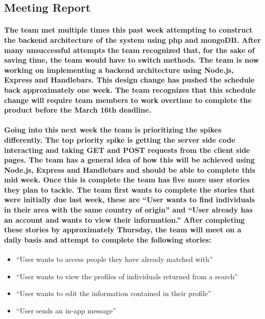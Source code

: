 \documentclass[12pt]{article}
\begin{document}
\begin{enumerate}
\begin{enumerate}
\begin{enumerate}
\begin{enumerate}
\section{\bf Meeting Report}

\paragraph{\normalfont \indent The team met multiple times this past week attempting to construct the backend architecture of the system using php and mongoDB. After many unsuccessful attempts the team recognized that, for the sake of saving time, the team would have to switch methods. The team is now working on implementing a backend architecture using Node.js, Express and Handlebars. This design change has pushed the schedule back approximately one week. The team recognizes that this schedule change will require team members to work overtime to complete the product before the March 16th deadline.
}
\paragraph{\normalfont \indent Going into this next week the team is prioritizing the spikes differently. The top priority spike is getting the server side code interacting and taking GET and POST requests from the client side pages. The team has a general idea of how this will be achieved using Node.js, Express and Handlebars and should be able to complete this mid week. Once this is complete the team has five more user stories they plan to tackle. The team first wants to complete the stories that were initially due last week, these are “User wants to find individuals in their area with the same country of origin” and “User already has an account and wants to view their information.” After completing these stories by approximately Thursday, the team will meet on a daily basis and attempt to complete the following stories:
}

  \begin{itemize}
    \item “User wants to access people they have already matched with”
    \item “User wants to view the profiles of individuals returned from a search”
    \item “User wants to edit the information contained in their profile”
    \item “User sends an in-app message”
  \end{itemize}


\end{enumerate}
\end{enumerate}
\end{enumerate}
\end{enumerate}
\end{document}
